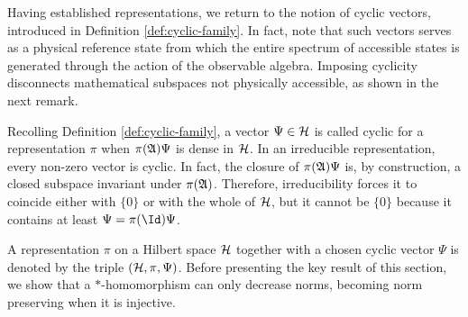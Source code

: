 Having established representations, we return to the notion of cyclic vectors, introduced in Definition \ref{def:cyclic-family}. In fact, note that such vectors serves as a physical reference state from which the entire spectrum of accessible states is generated through the action of the observable algebra. Imposing cyclicity disconnects mathematical subspaces not physically accessible, as shown in the next remark.

\begin{remark}
	\label{rem:cyclic-vector}
	Recolling Definition \ref{def:cyclic-family}, a vector $\Psi \in \H$ is called cyclic for a representation $\pi$ when $\pi(\mathfrak{A})\Psi$ is dense in $\H$.  In an irreducible representation, every non-zero vector is cyclic. In fact, the closure of $\pi(\mathfrak{A})\Psi$ is, by construction, a closed subspace invariant under $\pi(\mathfrak{A})$. Therefore, irreducibility forces it to coincide either with $\{0\}$ or with the whole of $\H$, but it cannot be $\{0\}$ because it contains at least  $\Psi = \pi(\Id)\Psi$.
\end{remark}

A representation $\pi$ on a Hilbert space $\H$ together with a chosen cyclic vector $\Psi$ is denoted by the triple $(\H, \pi, \Psi)$. Before presenting the key result of this section, we show that a $*$-homomorphism can only decrease norms, becoming norm preserving when it is injective.


